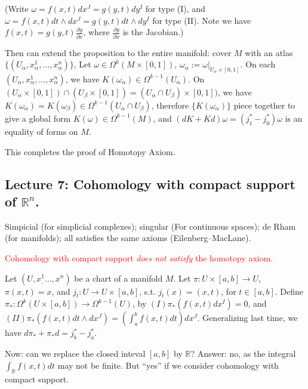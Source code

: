 \documentclass{article}
\theoremstyle{mystyle}
\theoremstyle{remark}
\numberwithin{equation}{section}
\begin{document}
(Write $\omega = f(x,t) dx^J = g(y,t) d y^I$ for type (I), and $\omega = f(x,t)dt \wedge d x^J = g(y,t) dt\wedge dy^I$ for type (II). Note we have $f(x,t) = g(y,t) \frac{\partial y}{\partial x}$, where $\frac{\partial y}{\partial x}$ is the Jacobian.)

Then can extend the proposition to the entire manifold: cover $M$ with an atlas $\{(U_\alpha,x^1_\alpha,...,x^n_\alpha)\}$, Let $\omega \in \Omega^k(M\times [0,1])$, $\omega_\alpha:=\omega|_{U_\alpha\times [0,1]}$. On each $(U_\alpha,x^1_\alpha,...,x^n_\alpha)$, we have $K(\omega_\alpha) \in \Omega^{k-1}(U_\alpha)$. On $(U_\alpha\times [0,1])\cap (U_\beta\times [0,1])=(U_\alpha\cap U_\beta)\times [0,1])$, we have $K(\omega_\alpha) = K(\omega_\beta) \in \Omega^{k-1}(U_\alpha\cap U_\beta)$, therefore $\{K(\omega_\alpha)\}$ piece together to give a global form $K(\omega) \in \Omega^{k-1}(M)$, and $(dK+Kd)\omega = (j_1^*-j_0^*)\omega$ is an equality of forms on $M$.

This completes the proof of Homotopy Axiom.




\subsection{Lecture 7: Cohomology with compact support of $\mathbb{R}^n$.}

Simpicial (for simplicial complexes); singular (For continuous spaces); de Rham (for manifolds); all satisfies the same axioms (Eilenberg--MacLane).

\textcolor{red}{Cohomology with compact support \emph{does not satisfy} the homotopy axiom.}

Let $(U,x^1_,...,x^n)$ be a chart of a manifold $M$. Let $\pi\colon U\times [a,b]\rightarrow U$, $\pi(x,t)=x$, and $j_t\colon U\rightarrow U\times [a,b]$, s.t. $j_t(x) = (x,t)$, for $t\in [a,b]$. Define $\pi_*\colon \Omega^k(U\times[a,b])\rightarrow \Omega^{k-1}(U)$, by $(I)\pi_*(f(x,t)d x^I) = 0$, and $(II) \pi_*(f(x,t)dt\wedge d x^J) = \left(\int^b_a f(x,t)dt\right)dx^J$. Generalizing last time, we have $d \pi_*+\pi_*d = j_b^*-j_a^*$.

Now: can we replace the closed inteval $[a,b]$ by $\mathbb{R}$? Answer: no, as the integral $\int_{\mathbb{R}} f(x,t)dt$ may not be finite. But ``yes'' if we consider cohomology with compact support.
\end{document}
